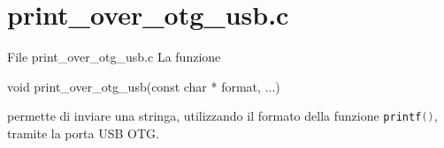 \section{print\_over\_otg\_usb.c}
\begin{frame}[fragile]{File print\_over\_otg\_usb.c}
  La funzione
  \begin{C}
    void print_over_otg_usb(const char * format, ...)
  \end{C}
  permette di inviare una stringa, utilizzando il formato della funzione \lstinline[language=C]!printf()!, tramite la porta USB OTG.
\end{frame}



